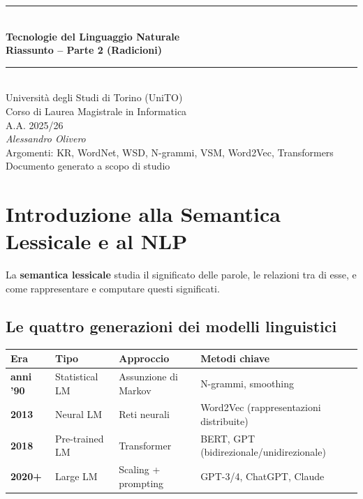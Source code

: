 \documentclass[12pt,a4paper]{article}
\begin{document}
\begin{titlepage}
  \centering
  \vspace*{2cm}
  {\color{primary}\rule{\linewidth}{2pt}}\\[0.5cm]
  {\Huge\bfseries\color{primary} Tecnologie del Linguaggio Naturale}\\[0.4cm]
  {\Large\bfseries\color{darkgray} Riassunto -- Parte 2 (Radicioni)}\\[0.3cm]
  {\color{primary}\rule{\linewidth}{2pt}}\\[1cm]
  {\large Università degli Studi di Torino (UniTO)}\\[0.2cm]
  {\large Corso di Laurea Magistrale in Informatica}\\[0.2cm]
  {\large A.A. 2025/26}\\[2cm]
  {\large\itshape Alessandro Olivero}\\[0.5cm]
  {\normalsize\color{darkgray} Argomenti: KR, WordNet, WSD, N-grammi, VSM, Word2Vec, Transformers}\\[3cm]
  {\small\color{darkgray} Documento generato a scopo di studio}
  \vfill
\end{titlepage}

\tableofcontents
\newpage

\section{Introduzione alla Semantica Lessicale e al NLP}

La \textbf{semantica lessicale} studia il significato delle parole, le relazioni tra di esse, e come rappresentare e computare questi significati.

\subsection{Le quattro generazioni dei modelli linguistici}

\begin{center}
\begin{tabular}{>{\bfseries}llll}
\toprule
Era & Tipo & Approccio & Metodi chiave \\
\midrule
anni '90 & Statistical LM & Assunzione di Markov & N-grammi, smoothing \\
2013 & Neural LM & Reti neurali & Word2Vec (rappresentazioni distribuite) \\
2018 & Pre-trained LM & Transformer & BERT, GPT (bidirezionale/unidirezionale) \\
2020+ & Large LM & Scaling + prompting & GPT-3/4, ChatGPT, Claude \\
\bottomrule
\end{tabular}
\end{center}
\end{document}
